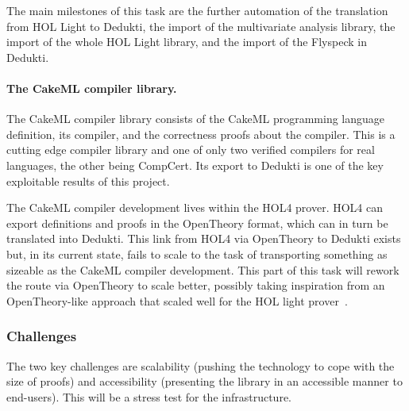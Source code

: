 The main milestones of this task are the further automation of the
translation from {HOL Light} to {Dedukti}, the import of the
multivariate analysis library, the import of the whole {HOL Light}
library, and the import of the {Flyspeck} in {Dedukti}.

\paragraph*{The CakeML compiler library.}

The CakeML compiler library consists of the CakeML programming language
definition, its compiler, and the correctness proofs about the
compiler. This is a cutting edge compiler library and one of only two
verified compilers for real languages, the other being CompCert. Its
export to Dedukti is one of the key exploitable results of this project.

The CakeML compiler development lives within the HOL4 prover. HOL4 can
export definitions and proofs in the OpenTheory format, which can in
turn be translated into Dedukti. This link from HOL4 via OpenTheory to
Dedukti exists but, in its current state, fails to scale to the task
of transporting something as sizeable as the CakeML compiler
development. This part of this task will rework the route via
OpenTheory to scale better, possibly taking inspiration from an
OpenTheory-like approach that scaled well for the HOL light
prover~\cite{KaliszykK13}.


\subsubsection*{Challenges}

The two key challenges are scalability (pushing the technology to cope
with the size of proofs) and accessibility (presenting the library in
an accessible manner to end-users). This will be a stress test for the
infrastructure.

